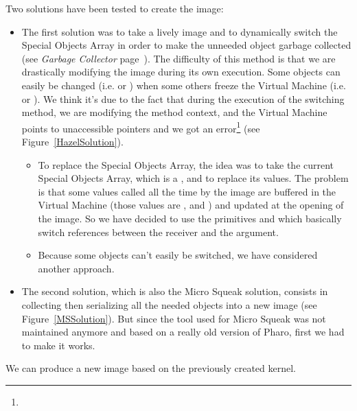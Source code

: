 Two solutions have been tested to create the image:
\begin{itemize}
	\item The first solution was to take a lively image and to dynamically switch the \gls{Special Objects Array} in order to make the unneeded object garbage collected (see \emph{\gls{Garbage Collector}} page~\pageref{glossary}). The difficulty of this method is that we are drastically modifying the image during its own execution. Some objects can easily be changed (i.e.  or ) when some others freeze the Virtual Machine (i.e.  or ). We think it's due to the fact that during the execution of the switching method, we are modifying the method context, and the Virtual Machine points to unaccessible pointers and we got an error\footnote{} (see Figure~\ref{HazelSolution}).
	\begin{itemize}
		\item To replace the \gls{Special Objects Array}, the idea was to take the current \gls{Special Objects Array}, which is a , and to replace its values. The problem is that some values called all the time by the image are buffered in the Virtual Machine (those values are , and ) and updated at the opening of the image. So we have decided to use the \glspl{primitive}  and  which basically switch references between the receiver and the argument.
		\item Because some objects can't easily be switched, we have considered another approach.
	\end{itemize}
	\item The second solution, which is also the \gls{Micro Squeak} solution, consists in collecting then serializing all the needed objects into a new image (see Figure~\ref{MSSolution}). But since the tool used for \gls{Micro Squeak} was not maintained anymore and based on a really old version of Pharo, first we had to make it works.
\end{itemize}

\inanutshell We can produce a new image based on the previously created kernel.